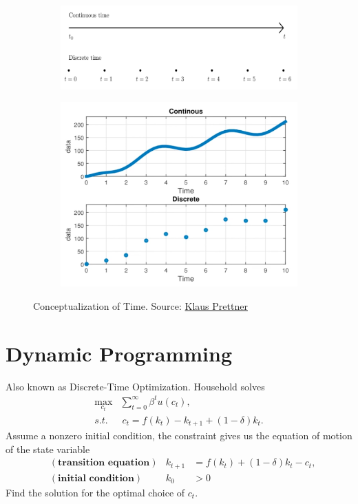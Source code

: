 \documentclass[11pt,a4paper]{book}
\theoremstyle{definition}\newtheorem{definition}{Definition}
\theoremstyle{definition}\newtheorem{fact}{Fact}
\theoremstyle{definition}\newtheorem{remark}{Remark}
\theoremstyle{definition}\newtheorem{ex}{Ex.}
\theoremstyle{definition}\newtheorem{project}{Project}
\theoremstyle{definition}\newtheorem{problem}{Problem}
\theoremstyle{definition}\newtheorem{example}{Example}
\numberwithin{theorem}{section}
\numberwithin{corollary}{chapter}
\numberwithin{assumption}{chapter}
\numberwithin{definition}{chapter}
\numberwithin{prop}{chapter}
\numberwithin{notation}{chapter}
\numberwithin{problem}{chapter}
\numberwithin{example}{chapter}
\numberwithin{fact}{chapter}
\numberwithin{ex}{chapter}
\begin{document}
	\begin{figure}[h!]
\centering
\begin{subfigure}[b]{0.45\linewidth}
\includegraphics[width=\linewidth]{figs/concept1.png}
\end{subfigure}
\begin{subfigure}[b]{0.45\linewidth}
\includegraphics[width=\linewidth]{figs/concept2.png}
\end{subfigure}
\caption{Conceptualization of Time. Source: \href{https://www.youtube.com/watch?v=w9VM7is9cl8}{Klaus Prettner}}
\label{fig:concept}
\end{figure}

	
	\section{Dynamic Programming}
	Also known as Discrete-Time Optimization. Household solves
	\begin{align*}
		\max_{c_t} & \sum^\infty_{t=0} \beta^t u(c_t), \\
		s.t. &\ c_t = f(k_t) - k_{t+1} + (1-\delta) k_t.
	\end{align*}
	Assume a nonzero initial condition, the constraint gives us the equation of motion of the state variable
	\begin{align*}
		&(\textbf{transition equation}) & k_{t+1} &= f(k_t) + (1-\delta)k_t - c_t, \\
		&(\textbf{initial condition}) & k_0 &> 0
	\end{align*}
	Find the solution for the optimal choice of $c_t$.
	
\end{document}
